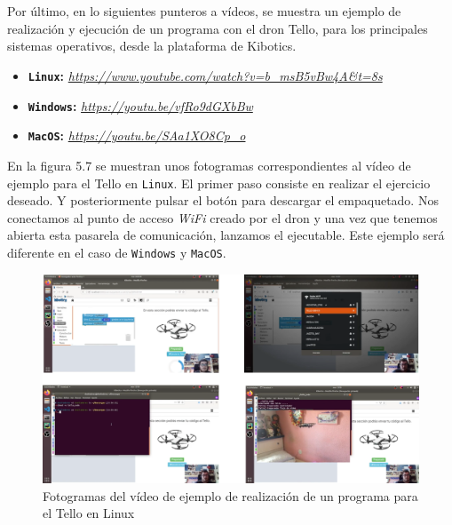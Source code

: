 \documentclass{report}
\begin{document}
\\
\\
Por último, en lo siguientes punteros a vídeos, se muestra un ejemplo de realización y ejecución de un programa con el dron Tello, para los principales sistemas operativos, desde la plataforma de Kibotics.
\begin{itemize}
	\item \textbf{\texttt{Linux}:}  \textit{\url{https://www.youtube.com/watch?v=b\_msB5vBw4A\&t=8s}}
	\item \textbf{\texttt{Windows}:}  \textit{\url{https://youtu.be/vfRo9dGXbBw}}
	\item \textbf{\texttt{MacOS}:} \textit{\url{https://youtu.be/SAa1XO8Cp\_o}}
\end{itemize}
En la figura 5.7 se muestran unos fotogramas correspondientes al vídeo de ejemplo para el Tello en \texttt{Linux}. El primer paso consiste en realizar el ejercicio deseado. Y posteriormente pulsar el botón para descargar el empaquetado. Nos conectamos al punto de acceso \textit{WiFi} creado por el dron y una vez que tenemos abierta esta pasarela de comunicación, lanzamos el ejecutable. Este ejemplo será diferente en el caso de \texttt{Windows} y \texttt{MacOS}.
\begin{figure}[h!]
  \centering
    \includegraphics[width=1\textwidth]{images/fotogramas_tello.png}
  \caption{Fotogramas del vídeo de ejemplo de realización de un programa para el Tello en Linux}
  \label{Fotogramas del vídeo de ejemplo de realización de un programa para el Tello en Linux}
\end{figure}


\end{document}

